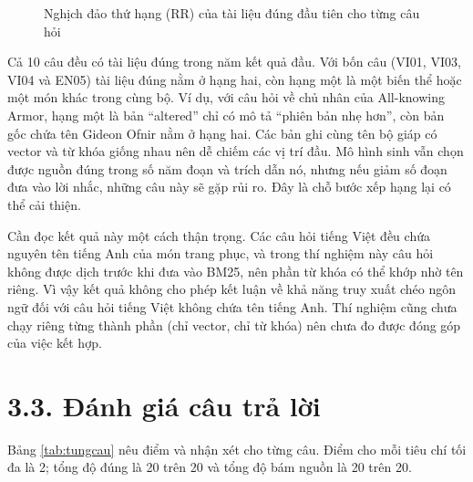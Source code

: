\begin{figure}[H]\centering
{}
\caption{Nghịch đảo thứ hạng (RR) của tài liệu đúng đầu tiên cho từng câu hỏi}\label{fig:rr}
\end{figure}


Cả 10 câu đều có tài liệu đúng trong năm kết quả đầu. Với bốn câu (VI01, VI03, VI04 và EN05) tài liệu đúng nằm ở hạng hai, còn hạng một là một biến thể hoặc một món khác trong cùng bộ. Ví dụ, với câu hỏi về chủ nhân của All-knowing Armor, hạng một là bản ``altered'' chỉ có mô tả ``phiên bản nhẹ hơn'', còn bản gốc chứa tên Gideon Ofnir nằm ở hạng hai. Các bản ghi cùng tên bộ giáp có vector và từ khóa giống nhau nên dễ chiếm các vị trí đầu. Mô hình sinh vẫn chọn được nguồn đúng trong số năm đoạn và trích dẫn nó, nhưng nếu giảm số đoạn đưa vào lời nhắc, những câu này sẽ gặp rủi ro. Đây là chỗ bước xếp hạng lại có thể cải thiện.


Cần đọc kết quả này một cách thận trọng. Các câu hỏi tiếng Việt đều chứa nguyên tên tiếng Anh của món trang phục, và trong thí nghiệm này câu hỏi không được dịch trước khi đưa vào BM25, nên phần từ khóa có thể khớp nhờ tên riêng. Vì vậy kết quả không cho phép kết luận về khả năng truy xuất chéo ngôn ngữ đối với câu hỏi tiếng Việt không chứa tên tiếng Anh. Thí nghiệm cũng chưa chạy riêng từng thành phần (chỉ vector, chỉ từ khóa) nên chưa đo được đóng góp của việc kết hợp.


\section{3.3. Đánh giá câu trả lời}

Bảng \ref{tab:tungcau} nêu điểm và nhận xét cho từng câu. Điểm cho mỗi tiêu chí tối đa là 2; tổng độ đúng là 20 trên 20 và tổng độ bám nguồn là 20 trên 20.


